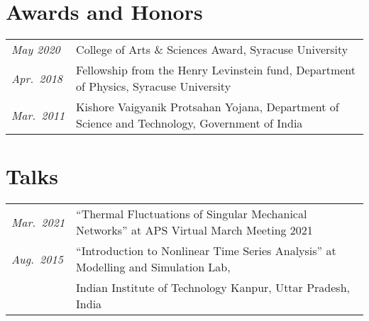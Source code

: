 \documentclass[10pt]{article}
\newcommand{\bname}{\underline{Manu Mannattil}} %
\begin{document}




\section*{Awards and Honors}

\begin{tabular}{@{}ll}
  \emph{May 2020}  & College of Arts \& Sciences Award, Syracuse University\\
  \emph{Apr.~2018} & Fellowship from the Henry Levinstein fund, Department of Physics, Syracuse University\\
  \emph{Mar.~2011} & Kishore Vaigyanik Protsahan Yojana, Department of Science and Technology, Government of India
\end{tabular}


\section*{Talks}

\begin{tabular}{@{}ll}
  \emph{Mar.~2021} & ``Thermal Fluctuations of Singular Mechanical Networks'' at APS Virtual March Meeting 2021\\
  \emph{Aug.~2015} & ``Introduction to Nonlinear Time Series Analysis'' at Modelling and Simulation Lab,\\ & Indian Institute of Technology Kanpur, Uttar Pradesh, India
\end{tabular}

\end{document}
